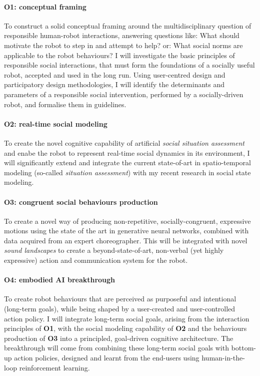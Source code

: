 \paragraph{\bf O1: conceptual framing} To construct a solid conceptual framing
around the multidisciplinary question of responsible human-robot interactions,
answering questions like: What should motivate the robot to step in
and attempt to help? or: What social norms are applicable to the robot behaviours? I
will investigate the basic principles of responsible social interactions, that
must form the foundations of a socially useful robot, accepted and used in the
long run.  Using user-centred design and participatory design methodologies, I
will identify the determinants and parameters of a responsible social
intervention, performed by a socially-driven robot, and formalise them in
guidelines.

\paragraph{\bf O2: real-time social modeling} To create the novel cognitive
capability of artificial \emph{social situation assessment} and enabe the
robot to represent real-time social dynamics in its environment, I will
significantly extend and integrate the current state-of-art in spatio-temporal
modeling (so-called \emph{situation assessment}) with my recent research in social
state modeling.

\paragraph{\bf O3: congruent social behaviours production} 
To create a novel way of producing non-repetitive, socially-congruent,
expressive motions using the state of the art in generative neural networks,
combined with data acquired from an expert choreographer. This will be
integrated with novel \emph{sound landscapes} to create a beyond-state-of-art,
non-verbal (yet highly expressive) action and communication system for the
robot.

\paragraph{\bf O4: embodied AI breakthrough} To create robot behaviours that are
perceived as purposeful and intentional (long-term goals), while being shaped by
a user-created and user-controlled action policy. I will integrate long-term
social goals, arising from the interaction principles of \textbf{O1}, with the
social modeling capability of \textbf{O2} and the behaviours production of
\textbf{O3} into a principled, goal-driven cognitive architecture. The
breakthrough will come from combining these long-term social goals with
bottom-up action policies, designed and learnt from the end-users using
human-in-the-loop reinforcement learning.

